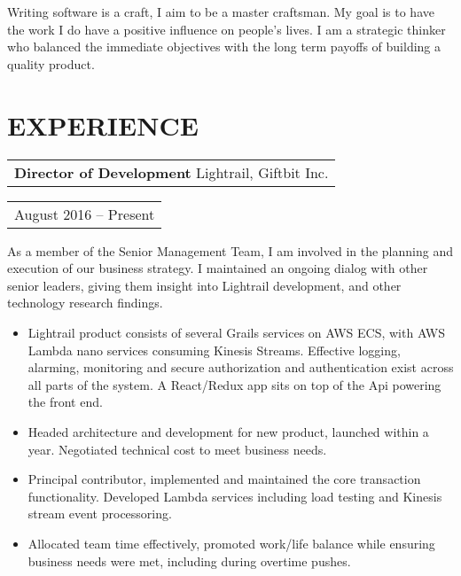 \documentclass{resume}
\begin{document}

\address{\href{https://www.github.com/baradoy}{github.com/baradoy}} %
\address{ \href{mailto:graham@baradoy.com}{graham@baradoy.com} \\ 250-216-7112 }

\begin{resume}

\section{}
    Writing software is a craft, I aim to be a master craftsman.
    My goal is to have the work I do have a positive influence on people's lives.
    I am a strategic thinker who balanced the immediate objectives with the long term payoffs of building a quality product.

\section{EXPERIENCE}
    \vspace{+0.1in}
    \begin{tabular}[t]{@{}l}
        {\bf Director of Development} Lightrail, Giftbit Inc.
    \end{tabular}\vspace{+0.05in}
    \hfill
    \begin{tabular}[t]{l@{}}
        August 2016 -- Present
    \end{tabular}
    As a member of the Senior Management Team, I am involved in the planning and execution of our business strategy.
    I maintained an ongoing dialog with other senior leaders, giving them insight into Lightrail development, and other technology research findings.
    \vspace{+0.05in}
    \begin{itemize} \itemsep -2pt
    \item Lightrail product consists of several Grails services on AWS ECS, with AWS Lambda nano services consuming Kinesis Streams. Effective logging, alarming, monitoring and secure authorization and authentication exist across all parts of the system. A React/Redux app sits on top of the Api powering the front end.
    \item Headed architecture and development for new product, launched within a year. Negotiated technical cost to meet business needs.
    \item Principal contributor, implemented and maintained the core transaction functionality. Developed Lambda services including load testing and Kinesis stream event processoring.
    \item Allocated team time effectively, promoted work/life balance while ensuring business needs were met, including during overtime pushes.
    \end{itemize}


\end{resume}
\end{document}
